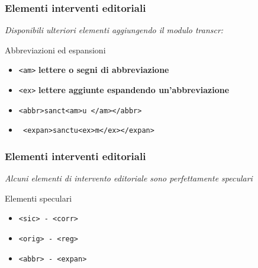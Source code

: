 \begin{frame}
    \frametitle{Elementi interventi editoriali}
    \addtocounter{nframe}{1}
    
    \textit{Disponibili ulteriori elementi aggiungendo il modulo transcr:}
    \begin{block}{Abbreviazioni ed espansioni}
        \begin{itemize}
            \item \texttt{<am>} \textbf{lettere o segni di abbreviazione}
            \item \texttt{<ex>} \textbf{lettere aggiunte espandendo un’abbreviazione}
            \item[] \texttt{<abbr>sanct<am>u~</am></abbr>}
            \item[] \texttt{ <expan>sanctu<ex>m</ex></expan>}
        \end{itemize}
        
    \end{block}
    
\end{frame}
 

 \begin{frame}
    \frametitle{Elementi interventi editoriali}
    \addtocounter{nframe}{1}
    

    \textit{Alcuni elementi di intervento editoriale sono perfettamente speculari}
    \begin{block}{Elementi speculari}
        \begin{itemize}
            \item \texttt{<sic> - <corr>} 
            \item \texttt{<orig> - <reg>}
            \item \texttt{<abbr> - <expan>}
        \end{itemize}
        
    \end{block}
    
\end{frame}

